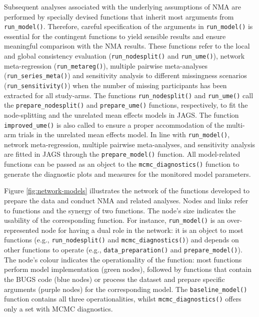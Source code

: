 Subsequent analyses associated with the underlying assumptions of NMA are performed
by specially devised functions that inherit most arguments from \texttt{run\_model()}.
Therefore, careful specification of the arguments in \texttt{run\_model()} is essential
for the contingent functions to yield sensible results and ensure meaningful
comparison with the NMA results. These functions refer to the local and global
consistency evaluation (\texttt{run\_nodesplit()} and \texttt{run\_ume()}), network meta-regression
(\texttt{run\_metareg()}), multiple pairwise meta-analyses (\texttt{run\_series\_meta()}) and
sensitivity analysis to different missingness scenarios (\texttt{run\_sensitivity()}) when
the number of missing participants has been extracted for all study-arms.
The functions \texttt{run\_nodesplit()} and \texttt{run\_ume()} call the \texttt{prepare\_nodesplit()} and
\texttt{prepare\_ume()} functions, respectively, to fit the node-splitting and the unrelated
mean effects models in JAGS. The function \texttt{improved\_ume()} is also called to ensure
a proper accommodation of the multi-arm trials in the unrelated mean effects model.
In line with \texttt{run\_model()}, network meta-regression, multiple pairwise meta-analyses,
and sensitivity analysis are fitted in JAGS through the \texttt{prepare\_model()} function.
All model-related functions can be passed as an object to the \texttt{mcmc\_diagnostics()}
function to generate the diagnostic plots and measures for the monitored model
parameters.

Figure \ref{fig:network-models} illustrates the network of the functions
developed to prepare the data and conduct NMA and related analyses. Nodes and links
refer to functions and the synergy of two functions. The node's size indicates
the usability of the corresponding function. For instance, \texttt{run\_model()} is an
over-represented node for having a dual role in the network: it is an object
to most functions (e.g., \texttt{run\_nodesplit()} and \texttt{mcmc\_diagnostics()}) and depends
on other functions to operate (e.g., \texttt{data\_preparation()} and \texttt{prepare\_model()}).
The node's colour indicates the operationality of the function: most functions
perform model implementation (green nodes), followed by functions that contain
the BUGS code (blue nodes) or process the dataset and prepare specific arguments
(purple nodes) for the corresponding model. The \texttt{baseline\_model()} function contains
all three operationalities, whilst \texttt{mcmc\_diagnostics()} offers only a set with
MCMC diagnostics.

